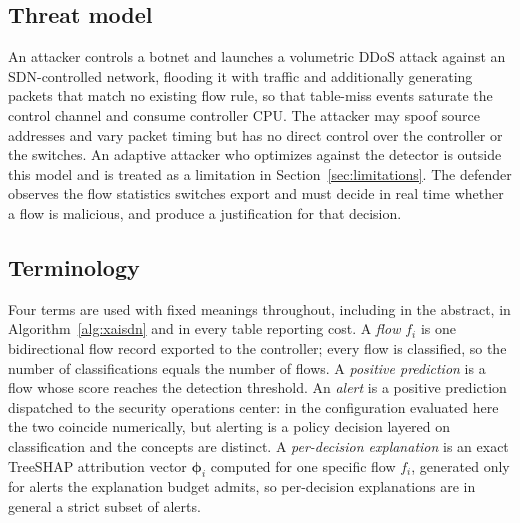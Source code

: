 \documentclass{ieeeaccess}
\begin{document}
\subsection{Threat model}
An attacker controls a botnet and launches a volumetric DDoS attack against an
SDN-controlled network, flooding it with traffic and additionally generating
packets that match no existing flow rule, so that table-miss events saturate the
control channel and consume controller CPU. The attacker may spoof source
addresses and vary packet timing but has no direct control over the controller or
the switches. An adaptive attacker who optimizes against the detector is outside
this model and is treated as a limitation in Section~\ref{sec:limitations}. The
defender observes the flow statistics switches export and must decide in real
time whether a flow is malicious, and produce a justification for that decision.

\subsection{Terminology}
\label{sec:terminology}
Four terms are used with fixed meanings throughout, including in the abstract, in
Algorithm~\ref{alg:xaisdn} and in every table reporting cost. A \emph{flow} $f_i$
is one bidirectional flow record exported to the controller; every flow is
classified, so the number of classifications equals the number of flows. A
\emph{positive prediction} is a flow whose score reaches the detection threshold.
An \emph{alert} is a positive prediction dispatched to the security operations
center: in the configuration evaluated here the two coincide numerically, but
alerting is a policy decision layered on classification and the concepts are
distinct. A \emph{per-decision explanation} is an exact TreeSHAP attribution
vector $\boldsymbol{\phi}_i$ computed for one specific flow $f_i$, generated only
for alerts the explanation budget admits, so per-decision explanations are in
general a strict subset of alerts.
\end{document}
